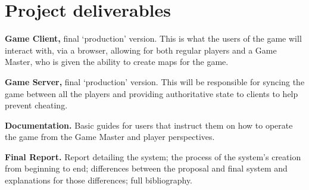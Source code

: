 \section{Project deliverables}
\begin{description}
	\item{\textbf{Game Client,} final `production' version.} This is what the users of the game will interact with, via a browser, allowing for both regular players and a Game Master, who is given the ability to create maps for the game.

	\item{\textbf{Game Server,} final `production' version.} This will be responsible for syncing the game between all the players and providing authoritative state to clients to help prevent cheating.

	\item{\textbf{Documentation.}} Basic guides for users that instruct them on how to operate the game from the Game Master and player perspectives.

	\item{\textbf{Final Report.}} Report detailing the system; the process of the system's creation from beginning to end; differences between the proposal and final system and explanations for those differences; full bibliography.
\end{description}